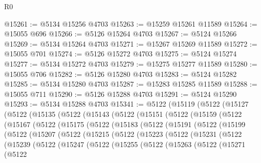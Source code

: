 \begin{lexlean}{R0}
\begin{coremodule}
@15261 := @5134 @15256 @4703
@15263 := @15259 @15261 @11589
@15264 := @15055 @696
@15266 := @5126 @15264 @4703
@15267 := @5124 @15266
@15269 := @5134 @15264 @4703
@15271 := @15267 @15269 @11589
@15272 := @15055 @701
@15274 := @5126 @15272 @4703
@15275 := @5124 @15274
@15277 := @5134 @15272 @4703
@15279 := @15275 @15277 @11589
@15280 := @15055 @706
@15282 := @5126 @15280 @4703
@15283 := @5124 @15282
@15285 := @5134 @15280 @4703
@15287 := @15283 @15285 @11589
@15288 := @15055 @711
@15290 := @5126 @15288 @4703
@15291 := @5124 @15290
@15293 := @5134 @15288 @4703
@15341 := @5122
    (@15119
      (@5122
        (@15127
          (@5122
            (@15135
              (@5122
                (@15143
                  (@5122
                    (@15151
                      (@5122
                        (@15159
                          (@5122
                            (@15167
                              (@5122
                                (@15175
                                  (@5122
                                    (@15183
                                      (@5122
                                        (@15191
                                          (@5122
                                            (@15199
                                              (@5122
                                                (@15207
                                                  (@5122
                                                    (@15215
                                                      (@5122
                                                        (@15223
                                                          (@5122
                                                            (@15231
                                                              (@5122
                                                                (@15239
                                                                  (@5122
                                                                    (@15247
                                                                      (@5122
                                                                        (@15255
                                                                          (@5122
                                                                            (@15263
                                                                              (@5122
                                                                                (@15271
                                                                                  (@5122

\end{coremodule}
\end{lexlean}
